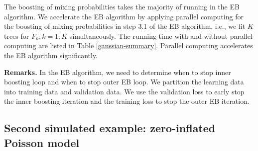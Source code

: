 \documentclass[11pt]{article}
\numberwithin{equation}{section}
\begin{document}
The boosting of mixing probabilities takes the majority of running in the EB algorithm. We accelerate the EB algorithm by applying parallel computing for the boosting of mixing probabilities in step 3.1 of the EB algorithm, i.e., we fit $K$ trees for $F_k, k=1:K$ simultaneously.
The running time with and without parallel computing are listed in Table \ref{gaussian-summary}.
Parallel computing accelerates the EB algorithm significantly.   


{\bf Remarks.} In the EB algorithm, we need to determine when to stop inner boosting loop and when to stop outer EB loop.
We partition the learning data into training data and validation data. 
We use the validation loss to early stop the inner boosting iteration and the training loss to stop the outer EB iteration.

\subsection{Second simulated example: zero-inflated Poisson model}
\end{document}
